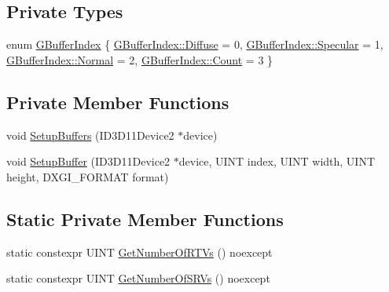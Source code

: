 \subsection*{Private Types}
\begin{DoxyCompactItemize}
\item 
enum \hyperlink{structmage_1_1_g_buffer_a72f0fc0f46052fdc9872c48c57894607}{G\+Buffer\+Index} \{ \hyperlink{structmage_1_1_g_buffer_a72f0fc0f46052fdc9872c48c57894607a41178642cae095a6bdb909119b4d16e8}{G\+Buffer\+Index\+::\+Diffuse} = 0, 
\hyperlink{structmage_1_1_g_buffer_a72f0fc0f46052fdc9872c48c57894607a39b0044dd8789d333e7794f359406740}{G\+Buffer\+Index\+::\+Specular} = 1, 
\hyperlink{structmage_1_1_g_buffer_a72f0fc0f46052fdc9872c48c57894607a960b44c579bc2f6818d2daaf9e4c16f0}{G\+Buffer\+Index\+::\+Normal} = 2, 
\hyperlink{structmage_1_1_g_buffer_a72f0fc0f46052fdc9872c48c57894607ae93f994f01c537c4e2f7d8528c3eb5e9}{G\+Buffer\+Index\+::\+Count} = 3
 \}
\end{DoxyCompactItemize}
\subsection*{Private Member Functions}
\begin{DoxyCompactItemize}
\item 
void \hyperlink{structmage_1_1_g_buffer_a5b0d4c4b0e29afad8524d11f66a5ff3d}{Setup\+Buffers} (I\+D3\+D11\+Device2 $\ast$device)
\item 
void \hyperlink{structmage_1_1_g_buffer_a598e55e0b309fd9b8ec8605d5f91cf32}{Setup\+Buffer} (I\+D3\+D11\+Device2 $\ast$device, U\+I\+NT index, U\+I\+NT width, U\+I\+NT height, D\+X\+G\+I\+\_\+\+F\+O\+R\+M\+AT format)
\end{DoxyCompactItemize}
\subsection*{Static Private Member Functions}
\begin{DoxyCompactItemize}
\item 
static constexpr U\+I\+NT \hyperlink{structmage_1_1_g_buffer_a6fc048cc3d9e012f56494a3592a84f3d}{Get\+Number\+Of\+R\+T\+Vs} () noexcept
\item 
static constexpr U\+I\+NT \hyperlink{structmage_1_1_g_buffer_a07d656b95c8586187ce48e67a8c89dfc}{Get\+Number\+Of\+S\+R\+Vs} () noexcept
\end{DoxyCompactItemize}
